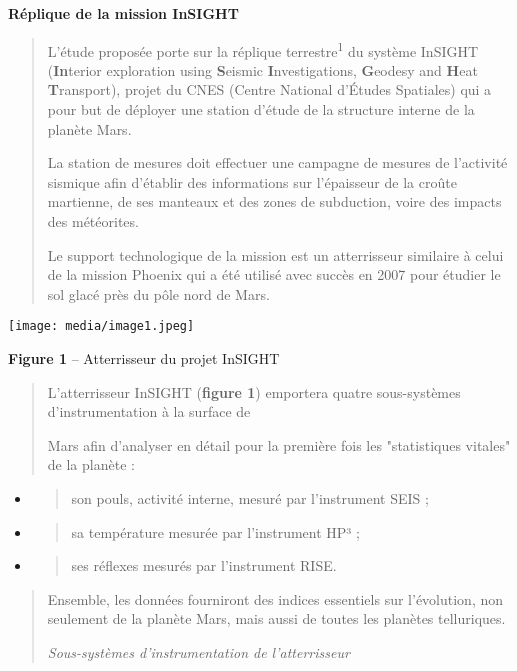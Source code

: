 \documentclass[]{article}
\date{}
\begin{document}
\protect\hypertarget{page2}{}{}\textbf{Réplique de la mission InSIGHT}

\begin{quote}
L'étude proposée porte sur la réplique terrestre\textsuperscript{1} du
système InSIGHT (\textbf{In}terior exploration using \textbf{S}eismic
\textbf{I}nvestigations, \textbf{G}eodesy and \textbf{H}eat
\textbf{T}ransport), projet du CNES (Centre National d'Études Spatiales)
qui a pour but de déployer une station d'étude de la structure interne
de la planète Mars.

La station de mesures doit effectuer une campagne de mesures de
l'activité sismique afin d'établir des informations sur l'épaisseur de
la croûte martienne, de ses manteaux et des zones de subduction, voire
des impacts des météorites.

Le support technologique de la mission est un atterrisseur similaire à
celui de la mission Phoenix qui a été utilisé avec succès en 2007 pour
étudier le sol glacé près du pôle nord de Mars.
\end{quote}

\texttt{[image: media/image1.jpeg]}

\textbf{Figure 1} -- Atterrisseur du projet InSIGHT

\begin{quote}
L'atterrisseur InSIGHT (\textbf{figure 1}) emportera quatre
sous-systèmes d'instrumentation à la surface de

Mars afin d'analyser en détail pour la première fois les "statistiques
vitales" de la planète :
\end{quote}

\begin{itemize}
\item
  \begin{quote}
  son pouls, activité interne, mesuré par l'instrument SEIS ;
  \end{quote}
\item
  \begin{quote}
  sa température mesurée par l'instrument HP³ ;
  \end{quote}
\item
  \begin{quote}
  ses réflexes mesurés par l'instrument RISE.
  \end{quote}
\end{itemize}

\begin{quote}
Ensemble, les données fourniront des indices essentiels sur l'évolution,
non seulement de la planète Mars, mais aussi de toutes les planètes
telluriques.

\emph{Sous-systèmes d'instrumentation de l'atterrisseur}
\end{quote}
\end{document}
